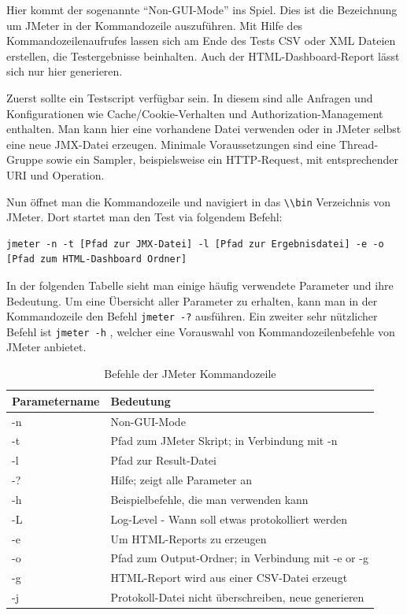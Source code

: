\documentclass[a4paper,12pt]{article}
\newcommand{\codeInLine}[1]{%
\colorbox{graybackgroundColor}{\lstinline{#1}} %
}
\begin{document}
Hier kommt der sogenannte "`Non-GUI-Mode"' ins Spiel. Dies ist die Bezeichnung um JMeter in der Kommandozeile auszuführen. Mit Hilfe des Kommandozeilenaufrufes lassen sich am Ende des Tests CSV oder XML Dateien erstellen, die Testergebnisse beinhalten. Auch der HTML-Dashboard-Report lässt sich nur hier generieren.

Zuerst sollte ein Testscript verfügbar sein. In diesem sind alle Anfragen und Konfigurationen wie Cache/Cookie-Verhalten und Authorization-Management enthalten. Man kann hier eine vorhandene Datei verwenden oder in JMeter selbst eine neue JMX-Datei erzeugen. Minimale Voraussetzungen sind eine Thread-Gruppe sowie ein Sampler, beispielsweise ein HTTP-Request, mit entsprechender URI und Operation.

Nun öffnet man die Kommandozeile und navigiert in das \codeInLine{\\bin} Verzeichnis von JMeter. Dort startet man den Test via folgendem Befehl:
\begin{lstlisting}
jmeter -n -t [Pfad zur JMX-Datei] -l [Pfad zur Ergebnisdatei] -e -o [Pfad zum HTML-Dashboard Ordner]
\end{lstlisting} 
In der folgenden Tabelle sieht man einige häufig verwendete Parameter und ihre Bedeutung. Um eine Übersicht aller Parameter zu erhalten, kann man in der Kommandozeile den Befehl \codeInLine{jmeter -?} ausführen. Ein zweiter sehr nützlicher Befehl ist \codeInLine{jmeter -h}, welcher eine Vorauswahl von Kommandozeilenbefehle von JMeter anbietet.
\begin{table}[H]
	\centering
	\begin{tabular}{|l|l|}
		\hline
		\textbf{Parametername} & \textbf{Bedeutung} \\
		\hline
		-n & Non-GUI-Mode \\
		-t & Pfad zum JMeter Skript; in Verbindung mit -n \\
		-l & Pfad zur Result-Datei \\
		-? & Hilfe; zeigt alle Parameter an \\
		-h & Beispielbefehle, die man verwenden kann \\
		-L & Log-Level - Wann soll etwas protokolliert werden \\
		-e & Um HTML-Reports zu erzeugen\\
		-o & Pfad zum Output-Ordner; in Verbindung mit -e or -g \\
		-g & HTML-Report wird aus einer CSV-Datei erzeugt \\ 
		-j & Protokoll-Datei nicht überschreiben, neue generieren \\
		\hline
	\end{tabular}
	\caption[tab_parameter_non_gui_all]{Befehle der JMeter Kommandozeile}
	\label{tab_parameter_non_gui_all}
\end{table}
\end{document}
